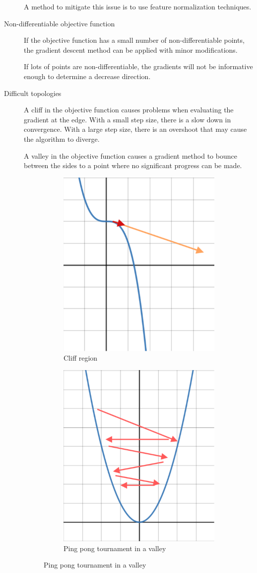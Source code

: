 \begin{description}
        A method to mitigate this issue is to use feature normalization techniques.

    \item[Non-differentiable objective function]
        If the objective function has a small number of non-differentiable points,
        the gradient descent method can be applied with minor modifications.
        
        If lots of points are non-differentiable, the gradients will not be informative enough 
        to determine a decrease direction.

    \item[Difficult topologies]
        A cliff in the objective function causes problems when evaluating the gradient at the edge.
        With a small step size, there is a slow down in convergence. 
        With a large step size, there is an overshoot that may cause the algorithm to diverge.

        A valley in the objective function causes a gradient method to bounce between the sides
        to a point where no significant progress can be made.

        \begin{figure}[ht]
            \begin{subfigure}{.5\textwidth}
                \centering
                \includegraphics[width=.30\linewidth]{img/cliff.png}
                \caption{Cliff region}
            \end{subfigure}%
            \begin{subfigure}{.5\textwidth}
                \centering
                \includegraphics[width=.30\linewidth]{img/valley.png}
                \caption{Ping pong tournament in a valley}
            \end{subfigure}
        \end{figure}
\end{description}



